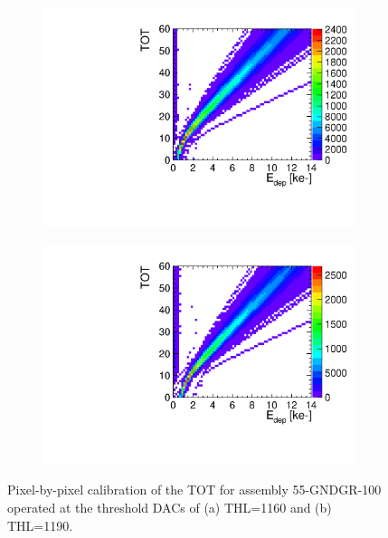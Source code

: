 \begin{figure}[htbp] \centering
  \begin{subfigure}[b]{0.45\textwidth}
    \includegraphics[width=\textwidth]{./figures/Calibration/TOTcalibration_W0005_E02_thresh1160.pdf}
    \caption{}
  \end{subfigure} \hfill
  \begin{subfigure}[b]{0.45\textwidth}
    \includegraphics[width=\textwidth]{./figures/Calibration/TOTcalibration_W0005_E02_thresh1190.pdf}
    \caption{}
  \end{subfigure}
  \caption{Pixel-by-pixel calibration of the TOT for assembly
    55-GNDGR-100 operated at the threshold DACs of (a) THL=1160 and
    (b) THL=1190.}
  \label{fig:TOTcalib_55GNDGR100}
\end{figure}

